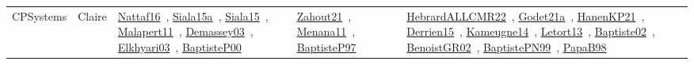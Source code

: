 {\begin{longtable}{lp{3cm}>{\raggedright\arraybackslash}p{6cm}>{\raggedright\arraybackslash}p{6cm}>{\raggedright\arraybackslash}p{8cm}}
CPSystems & Claire & \href{../works/Nattaf16.pdf}{Nattaf16}~\cite{Nattaf16}, \href{../works/Siala15a.pdf}{Siala15a}~\cite{Siala15a}, \href{../works/Siala15.pdf}{Siala15}~\cite{Siala15}, \href{../works/Malapert11.pdf}{Malapert11}~\cite{Malapert11}, \href{../works/Demassey03.pdf}{Demassey03}~\cite{Demassey03}, \href{../works/Elkhyari03.pdf}{Elkhyari03}~\cite{Elkhyari03}, \href{../works/BaptisteP00.pdf}{BaptisteP00}~\cite{BaptisteP00} & \href{../works/Zahout21.pdf}{Zahout21}~\cite{Zahout21}, \href{../works/Menana11.pdf}{Menana11}~\cite{Menana11}, \href{../works/BaptisteP97.pdf}{BaptisteP97}~\cite{BaptisteP97} & \href{../works/HebrardALLCMR22.pdf}{HebrardALLCMR22}~\cite{HebrardALLCMR22}, \href{../works/Godet21a.pdf}{Godet21a}~\cite{Godet21a}, \href{../works/HanenKP21.pdf}{HanenKP21}~\cite{HanenKP21}, \href{../works/Derrien15.pdf}{Derrien15}~\cite{Derrien15}, \href{../works/Kameugne14.pdf}{Kameugne14}~\cite{Kameugne14}, \href{../works/Letort13.pdf}{Letort13}~\cite{Letort13}, \href{../works/Baptiste02.pdf}{Baptiste02}~\cite{Baptiste02}, \href{../works/BenoistGR02.pdf}{BenoistGR02}~\cite{BenoistGR02}, \href{../works/BaptistePN99.pdf}{BaptistePN99}~\cite{BaptistePN99}, \href{../works/PapaB98.pdf}{PapaB98}~\cite{PapaB98}\\

\end{longtable}}
